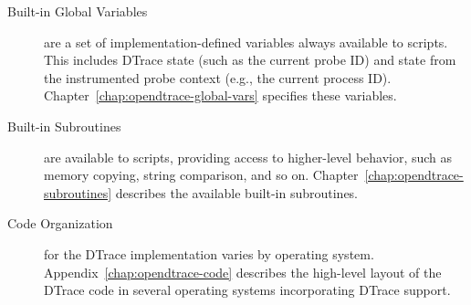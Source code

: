 \begin{description}
\item[Built-in Global Variables] are a set of implementation-defined
  variables always available to scripts.
  This includes DTrace state (such as the current probe ID) and state from the
  instrumented probe context (e.g., the current process ID).
  Chapter~\ref{chap:opendtrace-global-vars} specifies these variables.

\item[Built-in Subroutines] are available to scripts, providing access to
  higher-level behavior, such as memory copying, string comparison, and so on.
  Chapter~\ref{chap:opendtrace-subroutines} describes the available built-in
  subroutines.

\item[Code Organization] for the DTrace implementation varies by operating
  system.
  Appendix~\ref{chap:opendtrace-code} describes the high-level layout of the
  DTrace code in several operating systems incorporating DTrace support.


\end{description}
